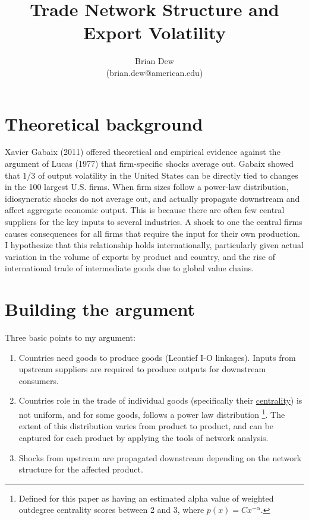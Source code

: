 \documentclass[10pt,letterpaper]{article}
\author{Brian Dew\\ (brian.dew@american.edu)}
\title{Trade Network Structure and Export Volatility}
\begin{document}
\maketitle

\section{Theoretical background}
Xavier Gabaix (2011) offered theoretical and empirical evidence against the argument of Lucas (1977) that firm-specific shocks average out. Gabaix showed that 1/3 of output volatility in the United States can be directly tied to changes in the 100 largest U.S. firms. When firm sizes follow a power-law distribution, idiosyncratic shocks do not average out, and actually propagate downstream and affect aggregate economic output. This is because there are often few central suppliers for the key inputs to several industries. A shock to one the central firms causes consequences for all firms that require the input for their own production. I hypothesize that this relationship holds internationally, particularly given actual variation in the volume of exports by product and country, and the rise of international trade of intermediate goods due to global value chains.

\section{Building the argument}
Three basic points to my argument:

\begin{enumerate}
\item Countries need goods to produce goods (Leontief I-O linkages). Inputs from upstream suppliers are required to produce outputs for downstream consumers.
\item Countries role in the trade of individual goods (specifically their \href{https://en.wikipedia.org/wiki/Centrality}{centrality}) is not uniform, and for some goods, follows a power law distribution \footnote{Defined for this paper as having an estimated alpha value of weighted outdegree centrality scores between 2 and 3, where $p(x) = Cx^{-\alpha}$.}. The extent of this distribution varies from product to product, and can be captured for each product by applying the tools of network analysis.
\item Shocks from upstream are propagated downstream depending on the network structure for the affected product. 
\end{enumerate}
\end{document}
